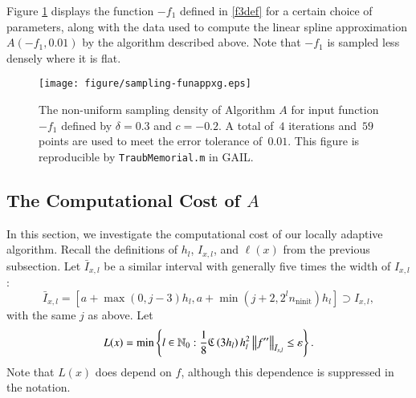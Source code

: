 \documentclass[review]{elsarticle}
\newcommand{\abstol}{\varepsilon}
\theoremstyle{definition}
\newcommand{\Ixl}{I_{x,l}}
\DeclareMathOperator{\ninit}{ninit}
\begin{document}
Figure \ref{fig:sampling-funappxg} displays the function $-f_1$ defined in
\eqref{f3def} for a certain choice of parameters, along with the data used to
compute the linear spline approximation $A(-f_1,0.01)$ by the algorithm
described above. Note that $-f_1$ is sampled less densely where it is flat.

\begin{figure}[tbh]
\centering
\texttt{[image: figure/sampling-funappxg.eps]}
\caption{The non-uniform sampling density of Algorithm $A$ for input function
$-f_1$ defined by $\delta = 0.3$ and $c = -0.2$. A total of~$4$ iterations
and~$59$ points are used to meet the error tolerance of~$0.01$. This figure is
reproducible by {\tt TraubMemorial.m} in GAIL.}
\label{fig:sampling-funappxg}
\end{figure}


\subsection{The Computational Cost of $A$} \label{subsec:appxcost}

In this section, we investigate the computational cost of our locally adaptive
algorithm. Recall the definitions of $h_l$, $\Ixl$, and $\ell(x)$ from the previous subsection.  
Let
$\bar{I}_{x,l}$ be a similar interval with generally five times the
width of $\Ixl$:
\begin{equation}
\bar{I}_{x,l}=\left[a+\max(0,j-3)h_l, a+ \min(j+2,2^l n_{\ninit})h_l\right] \supset \Ixl,
\end{equation}
with the same $j$ as above.  Let
\begin{equation}\label{eqn:defoflx}
L(x) = \min \left\{ l \in \mathbb{N}_0 :  \frac{1}{8} \fC\left(3h_l\right)h_l^2\norm[\bar{I}_{x,l}]{f''} \le \abstol \right\}.
\end{equation}
Note that $L(x)$ does depend on $f$, although this dependence is suppressed in
the notation.
\end{document}
